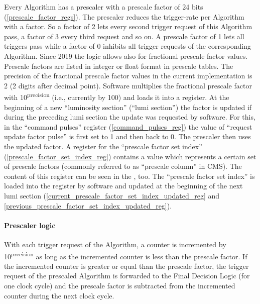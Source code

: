 Every Algorithm has a prescaler with a prescale factor of 24 bits (\ref{prescale_factor_regs}). The prescaler reduces the trigger-rate per Algorithm with a factor. So a factor of 2 lets every second trigger request of this Algorithm pass, a factor of 3 every third request and so on.
A prescale factor of 1 lets all triggers pass while a factor of 0 inhibits all trigger requests of the corresponding Algorithm.
Since 2019 the logic allows also for fractional prescale factor values. Prescale factors are listed in integer or float
format in prescale tables.
The precision of the fractional prescale factor values in the current implementation is 2 (2 digits after decimal point).
Software multiplies the fractional prescale factor with 10\textsuperscript{\tiny{precision}} (i.e., currently by 100) and loads it into a register.
At the beginning of a new “luminosity section” (“lumi section”) the factor is updated if during the preceding lumi section the update was requested by software.
For this, in the “command pulses” register (\ref{command_pulses_reg}) the value of “request update factor pulse” is first set to 1 and then back to 0.
The prescaler then uses the updated factor.
A register for the “prescale factor set index” (\ref{prescale_factor_set_index_reg}) contains a value which represents a certain set
of prescale factors (commonly referred to as “prescale column” in CMS).
The content of this register can be seen in the \record, too.
The “prescale factor set index” is loaded into the register by software and updated at the beginning of
the next lumi section (\ref{current_prescale_factor_set_index_updated_reg} and \ref{previous_prescale_factor_set_index_updated_reg}).

\paragraph{Prescaler logic}
\label{sec:fdl:prescaler_logic}

With each trigger request of the Algorithm, a counter is incremented by 10\textsuperscript{\tiny{precision}} as long as the
incremented counter is less than the prescale factor. If the incremented counter is greater or equal than the prescale
factor, the trigger request of the prescaled Algorithm is forwarded to the Final Decision Logic (for one clock cycle)
and the prescale factor is subtracted from the incremented counter during the next clock cycle.


